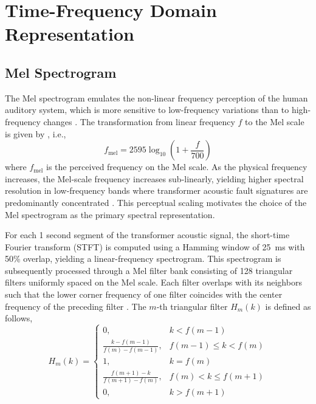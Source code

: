 \documentclass[twocolumn,iicol,pdflatex,sn-mathphys-num]{sn-jnl}%
\begin{document}
\section{Time-Frequency Domain Representation}
\label{section2}

\subsection{Mel Spectrogram}
\label{subsec1}
The Mel spectrogram emulates the non-linear frequency perception of the human auditory system, which is more sensitive to low-frequency variations than to high-frequency changes \cite{WANG2026119319,10768989}. The transformation from linear frequency $f$ to the Mel scale is given by \cite{SHAN2023112408,11097896}, i.e.,
\begin{equation}
	f_{\text{mel}} = 2595 \log_{10}\!\left(1 + \frac{f}{700}\right)
\end{equation}
\noindent where $f_{\text{mel}}$ is the perceived frequency on the Mel scale. As the physical frequency increases, the Mel-scale frequency increases sub-linearly, yielding higher spectral resolution in low-frequency bands where transformer acoustic fault signatures are predominantly concentrated \cite{4712660}. This perceptual scaling motivates the choice of the Mel spectrogram as the primary spectral representation.

For each 1 second segment of the transformer acoustic signal, the short-time Fourier transform (STFT) is computed using a Hamming window of 25~ms with 50\% overlap, yielding a linear-frequency spectrogram. This spectrogram is subsequently processed through a Mel filter bank consisting of 128 triangular filters uniformly spaced on the Mel scale. Each filter overlaps with its neighbors such that the lower corner frequency of one filter coincides with the center frequency of the preceding filter \cite{r1}. The $m$-th triangular filter $H_m(k)$ is defined as follows,
\begin{equation}
	H_m(k) = 
	\begin{cases} 
		0, & k < f(m-1) \\
		\frac{k - f(m-1)}{f(m) - f(m-1)}, & f(m-1) \leq k < f(m) \\
		1, & k = f(m) \\
		\frac{f(m+1) - k}{f(m+1) - f(m)}, & f(m) < k \leq f(m+1) \\
		0, & k > f(m+1)
	\end{cases}
\end{equation}
\end{document}
